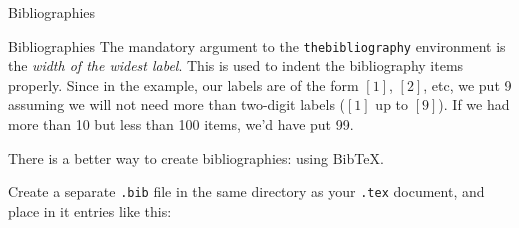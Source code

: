 \documentclass{beamer}
\begin{document}
\begin{frame}{Bibliographies}
\begin{center}
        \end{center}
    \end{frame}

    \begin{frame}{Bibliographies}
        The mandatory argument to the \texttt{thebibliography} environment is the \emph{width of the widest label}. This is used to indent the bibliography items properly. Since in the example, our labels are of the form $[1]$, $[2]$, etc, we put 9 assuming we will not need more than two-digit labels ($[1]$ up to $[9]$). If we had more than 10 but less than 100 items, we'd have put 99.
        
        \bigskip
        
        There is a better way to create bibliographies: using Bib\TeX{}. 
        
        \bigskip
        
        Create a separate \texttt{.bib} file in the same directory as your \texttt{.tex} document, and place in it entries like this:
    \end{frame}
\end{document}
